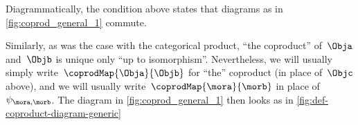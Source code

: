 \begin{remark}
    Diagrammatically, the condition above states that diagrams as in \cref{fig:coprod_general_1} commute.
    \begin{marginfigure}
        \centering
        \caption{}
        \label{fig:coprod_general_1}
        \label{fig:def-coproduct-diagram}
    \end{marginfigure}
    Similarly, as was the case with the categorical product, ``the coproduct'' of~$\Obja$ and~$\Objb$ is unique only ``up to isomorphism''.
    Nevertheless, we will usually simply write~$\coprodMap{\Obja}{\Objb}$ for ``the'' coproduct (in place of~$\Objc$ above), and we will usually write~$\coprodMap{\mora}{\morb}$ in place of~$\psi_{\mora, \morb}$.
    The diagram in \cref{fig:coprod_general_1} then looks as in \cref{fig:def-coproduct-diagram-generic}
\end{remark}

\begin{marginfigure}
    \centering
    \caption{}
    \label{fig:def-coproduct-diagram-generic}
\end{marginfigure}
%
%

%



